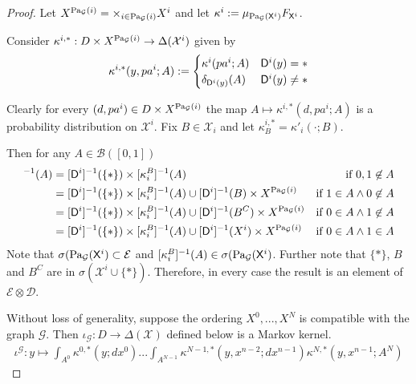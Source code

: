 \begin{proof}
Let $X^{\text{Pa}_{\mathcal{G}}(i)}=\times_{i\in\text{Pa}_{\mathcal{G}}(i)} X^i$ and let $\kappa^i:=\mu_{\text{Pa}_{\mathcal{G}}(\mathsf{X}^i)} F_{\mathsf{X}^i}$.

Consider $\kappa^{i,*}:D\times X^{\text{Pa}_{\mathcal{G}}(i)} \to \Delta(\mathcal{X}^i)$ given by \begin{align}
    \kappa^{i,*}(y,pa^i;A) := \begin{cases}\kappa^i(pa^i;A) &\mathsf{D}^i(y) = * \\
    \delta_{\mathsf{D}^i(y)}(A) & \mathsf{D}^i(y) \neq *\end{cases}\label{eq:passive}
\end{align}

Clearly for every $(d,pa^i) \in D\times X^{\text{Pa}_{\mathcal{G}}(i)}$ the map $A\mapsto \kappa^{i,*}(d,pa^i;A)$ is a probability distribution on $\mathcal{X}^i$. Fix $B\in\mathcal{X}_i$ and let $\kappa^{i,*}_B=\kappa'_i(\cdot;B)$.

Then for any $A\in \mathcal{B}([0,1])$
\begin{align}
    [\kappa^{i,*}_B]^{-1}(A) &= [\RV{D}^i]^{-1}(\{*\})\times[\kappa^B_i]^{-1}(A) &\text{if }0,1\not\in A\\
    &= [\RV{D}^i]^{-1}(\{*\})\times[\kappa^B_i]^{-1}(A)\cup [\RV{D}^i]^{-1}(B)\times X^{\PA{\mathcal{G}}{i}} &\text{if }1\in A\land 0\not\in A\\
    &= [\RV{D}^i]^{-1}(\{*\})\times[\kappa^B_i]^{-1}(A)\cup [\RV{D}^i]^{-1}(B^C)\times X^{\PA{\mathcal{G}}{i}} &\text{if }0\in A\land 1\not\in A\\
    &= [\RV{D}^i]^{-1}(\{*\})\times[\kappa^B_i]^{-1}(A)\cup [\RV{D}^i]^{-1}(X^i)\times X^{\PA{\mathcal{G}}{i}} &\text{if }0\in A\land 1\in A
\end{align}
Note that $\sigma(\text{Pa}_{\mathcal{G}}(\mathsf{X}^i)\subset\mathcal{E}$ and $[\kappa^B_i]^{-1}(A)\in \sigma(\text{Pa}_{\mathcal{G}}(\mathsf{X}^i)$. Further note that $\{*\}$, $B$ and $B^C$ are in $\sigma(\mathcal{X}^i\cup\{*\})$. Therefore, in every case the result is  an element of $\mathcal{E}\otimes\mathcal{D}$.

Without loss of generality, suppose the ordering $X^0,...,X^N$ is compatible with the graph $\mathcal{G}$. Then $\iota_{\mathcal{G}}:D\to \Delta(\mathcal{X})$ defined below is a Markov kernel.
\begin{align}
    \iota^{\mathcal{G}}:y\mapsto \int_{A^0} \kappa^{0,*}(y;dx^0) ... \int_{A^{N-1}} \kappa^{N-1,*}(y,x^{n-2};dx^{n-1}) \kappa^{N,*}(y,x^{n-1};A^N) \label{eq:bigproduct}
\end{align}


\end{proof}
